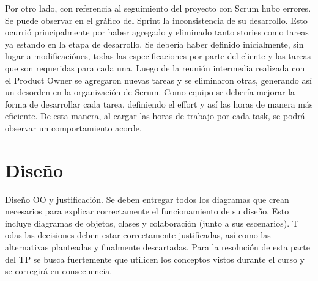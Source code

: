 \documentclass[a4paper, 11pt]{article}
\begin{document}
Por otro lado, con referencia al seguimiento del proyecto con Scrum hubo errores. Se puede observar en el gráfico del Sprint la inconsistencia de su desarrollo. Esto ocurrió principalmente por haber agregado y eliminado tanto stories como tareas ya estando en la etapa de desarrollo. Se debería haber definido inicialmente, sin lugar a modificaciónes, todas las especificaciones por parte del cliente y las tareas que son requeridas para cada una. Luego de la reunión intermedia realizada con el Product Owner se agregaron nuevas tareas y se eliminaron otras, generando así un desorden en la organización de Scrum. Como equipo se debería mejorar la forma de desarrollar cada tarea, definiendo el effort y así las horas de manera más eficiente. De esta manera, al cargar las horas de trabajo por cada task, se podrá observar un comportamiento acorde. 


\section{Diseño}

Diseño OO y justificación. Se deben entregar todos los diagramas que crean necesarios para explicar correctamente el funcionamiento de su diseño. Esto incluye diagramas de objetos, clases y colaboración (junto a sus escenarios). T odas las decisiones deben estar correctamente justificadas, así como las alternativas planteadas y finalmente descartadas. Para la resolución de esta parte del TP se busca fuertemente que utilicen los conceptos vistos durante el curso y se corregirá en consecuencia.
\end{document}
